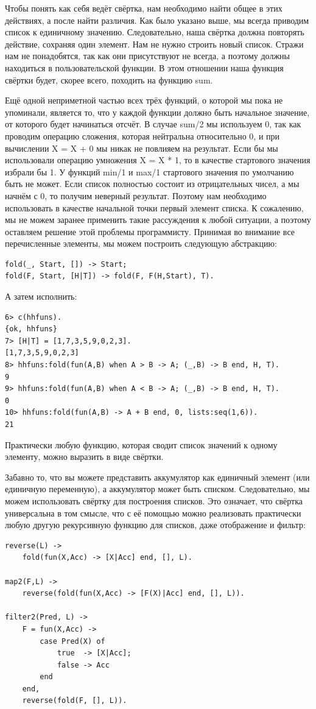 \documentclass[a4paper,12pt]{report}
\newcommand{\ops}{\colorbox{lgreen}}
\begin{document}
Чтобы понять как себя ведёт свёртка, нам необходимо найти общее в этих действиях, а после найти различия. Как было указано выше, мы всегда приводим список к единичному значению. Следовательно, наша свёртка должна повторять действие, сохраняя один элемент. Нам не нужно строить новый список. Стражи нам не понадобятся, так как они присутствуют не всегда, а поэтому должны находиться в пользовательской функции. В этом отношении наша функция свёртки будет, скорее всего, походить на функцию sum.

Ещё одной неприметной частью всех трёх функций, о которой мы пока не упоминали, является то, что у каждой функции должно быть начальное значение, от которого будет начинаться отсчёт. В случае \ops{sum/2} мы используем 0, так как проводим операцию сложения, которая нейтральна относительно 0, и при вычислении \ops{X = X + 0} мы никак не повлияем на результат. Если бы мы использовали операцию умножения \ops{X = X * 1}, то в качестве стартового значения избрали бы 1. У функций \ops{min/1} и \ops{max/1} стартового значения по умолчанию быть не может. Если список полностью состоит из отрицательных чисел, а мы начнём с 0, то получим неверный результат. Поэтому нам необходимо использовать в качестве начальной точки первый элемент списка. К сожалению, мы не можем заранее применить такие рассуждения к любой ситуации, а поэтому оставляем решение этой проблемы программисту. Принимая во внимание все перечисленные элементы, мы можем построить следующую абстракцию:
\begin{lstlisting}[style=erlang]
fold(_, Start, []) -> Start;
fold(F, Start, [H|T]) -> fold(F, F(H,Start), T).
\end{lstlisting}
А затем исполнить:
\begin{lstlisting}[style=erlang]
6> c(hhfuns).
{ok, hhfuns}
7> [H|T] = [1,7,3,5,9,0,2,3].   
[1,7,3,5,9,0,2,3]
8> hhfuns:fold(fun(A,B) when A > B -> A; (_,B) -> B end, H, T).
9
9> hhfuns:fold(fun(A,B) when A < B -> A; (_,B) -> B end, H, T).
0
10> hhfuns:fold(fun(A,B) -> A + B end, 0, lists:seq(1,6)).
21
\end{lstlisting}

Практически любую функцию, которая сводит список значений к одному элементу, можно выразить в виде свёртки.

Забавно то, что вы можете представить аккумулятор как единичный элемент (или единичную переменную), а аккумулятор может быть списком. Следовательно, мы можем использовать свёртку для построения списков. Это означает, что свёртка универсальна в том смысле, что с её помощью можно реализовать практически любую другую рекурсивную функцию для списков, даже отображение и фильтр:
\begin{lstlisting}[style=erlang]
reverse(L) ->
    fold(fun(X,Acc) -> [X|Acc] end, [], L).
 
map2(F,L) ->
    reverse(fold(fun(X,Acc) -> [F(X)|Acc] end, [], L)).
 
filter2(Pred, L) ->
    F = fun(X,Acc) ->
        case Pred(X) of
            true  -> [X|Acc];
            false -> Acc
        end
    end,
    reverse(fold(F, [], L)).
\end{lstlisting}
\end{document}
